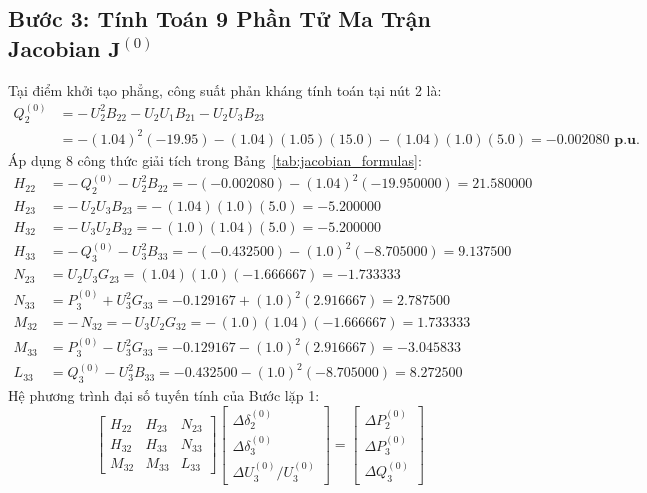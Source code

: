 \documentclass[12pt,a4paper,oneside]{report}
\begin{document}
\subsection{Bước 3: Tính Toán 9 Phần Tử Ma Trận Jacobian $\mathbf{J}^{(0)}$}
Tại điểm khởi tạo phẳng, công suất phản kháng tính toán tại nút 2 là:
\begin{align}
Q_2^{(0)} &= -\, U_2^2 B_{22} - U_2 U_1 B_{21} - U_2 U_3 B_{23} \nonumber \\
&= -(1.04)^2(-19.95) - (1.04)(1.05)(15.0) - (1.04)(1.0)(5.0) = \mathbf{-0.002080\text{ p.u.}}
\end{align}
Áp dụng 8 công thức giải tích trong Bảng~\ref{tab:jacobian_formulas}:
\begin{align}
H_{22} &= -\, Q_2^{(0)} - U_2^2 B_{22} = -(-0.002080) - (1.04)^2 (-19.950000) = \mathbf{21.580000} \\
H_{23} &= -\, U_2 U_3 B_{23} = -\, (1.04)(1.0)(5.0) = \mathbf{-5.200000} \\
H_{32} &= -\, U_3 U_2 B_{32} = -\, (1.0)(1.04)(5.0) = \mathbf{-5.200000} \\
H_{33} &= -\, Q_3^{(0)} - U_3^2 B_{33} = -(-0.432500) - (1.0)^2 (-8.705000) = \mathbf{9.137500} \\
N_{23} &= U_2 U_3 G_{23} = (1.04)(1.0)(-1.666667) = \mathbf{-1.733333} \\
N_{33} &= P_3^{(0)} + U_3^2 G_{33} = -0.129167 + (1.0)^2 (2.916667) = \mathbf{2.787500} \\
M_{32} &= -\, N_{32} = -\, U_3 U_2 G_{32} = -\, (1.0)(1.04)(-1.666667) = \mathbf{1.733333} \\
M_{33} &= P_3^{(0)} - U_3^2 G_{33} = -0.129167 - (1.0)^2 (2.916667) = \mathbf{-3.045833} \\
L_{33} &= Q_3^{(0)} - U_3^2 B_{33} = -0.432500 - (1.0)^2 (-8.705000) = \mathbf{8.272500}
\end{align}
Hệ phương trình đại số tuyến tính của Bước lặp 1:
\begin{equation}
\begin{bmatrix}
H_{22} & H_{23} & N_{23} \\
H_{32} & H_{33} & N_{33} \\
M_{32} & M_{33} & L_{33}
\end{bmatrix}
\begin{bmatrix}
\Delta \delta_2^{(0)} \\[3pt]
\Delta \delta_3^{(0)} \\[3pt]
\Delta U_3^{(0)} / U_3^{(0)}
\end{bmatrix}
=
\begin{bmatrix}
\Delta P_2^{(0)} \\[3pt]
\Delta P_3^{(0)} \\[3pt]
\Delta Q_3^{(0)}
\end{bmatrix}
\end{equation}
\end{document}

